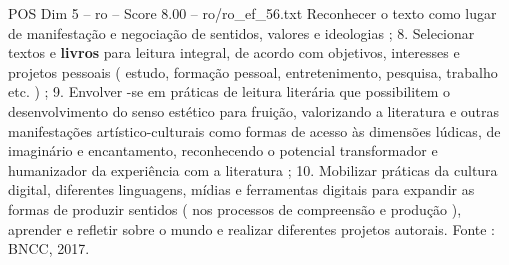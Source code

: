 \begin{textsample}{POS Dim 5 – ro – Score 8.00 – ro/ro\_ef\_56.txt}
Reconhecer o texto como lugar de manifestação e negociação de sentidos, valores e ideologias ; 8.
Selecionar textos e \textbf{livros} para leitura integral, de acordo com objetivos, interesses e projetos pessoais ( estudo, formação pessoal, entretenimento, pesquisa, trabalho etc. ) ; 9.
Envolver -se em práticas de leitura literária que possibilitem o desenvolvimento do senso estético para fruição, valorizando a literatura e outras manifestações artístico-culturais como formas de acesso às dimensões lúdicas, de imaginário e encantamento, reconhecendo o potencial transformador e humanizador da experiência com a literatura ; 10.
Mobilizar práticas da cultura digital, diferentes linguagens, mídias e ferramentas digitais para expandir as formas de produzir sentidos ( nos processos de compreensão e produção ), aprender e refletir sobre o mundo e realizar diferentes projetos autorais.
Fonte : BNCC, 2017.

\end{textsample}
